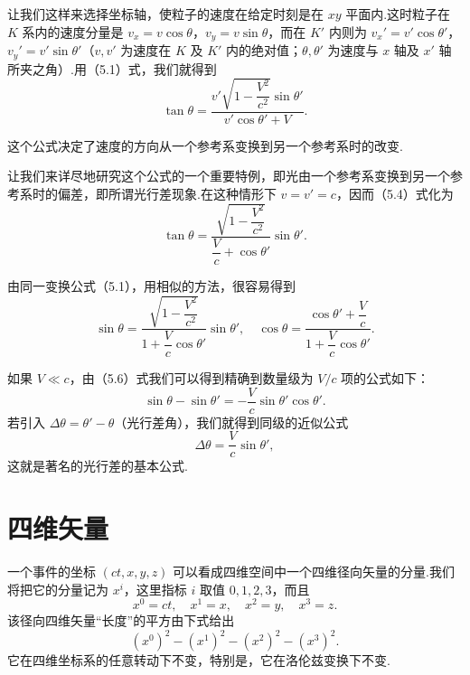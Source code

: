 让我们这样来选择坐标轴，使粒子的速度在给定时刻是在 $xy$ 平面内.这时粒子在 $K$ 系内的速度分量是 $v_x=v\cos\theta$，$v_y=v\sin\theta$，而在 $K'$ 内则为 $v_x'=v'\cos\theta'$，$v_y'=v'\sin\theta'$（$v,v'$ 为速度在 $K$ 及 $K'$ 内的绝对值；$\theta,\theta'$ 为速度与 $x$ 轴及 $x'$ 轴所夹之角）.用（5.1）式，我们就得到
\begin{equation}
  \tan\theta=\frac{v'\sqrt{1-\dfrac{V^2}{c^2}}\sin\theta'}
  {v'\cos\theta'+V}.
\end{equation}

这个公式决定了速度的方向从一个参考系变换到另一个参考系时的改变.

让我们来详尽地研究这个公式的一个重要特例，即光由一个参考系变换到另一个参考系时的偏差，即所谓光行差现象.在这种情形下 $v=v'=c$，因而（5.4）式化为
\begin{equation}
  \tan\theta=\frac{\sqrt{1-\dfrac{V^2}{c^2}}}{\dfrac{V}{c}+\cos\theta'}\sin\theta'.
\end{equation}

由同一变换公式（5.1），用相似的方法，很容易得到
\begin{equation}
  \sin\theta=\frac{\sqrt{1-\dfrac{V^2}{c^2}}}{1+\dfrac{V}{c}\cos\theta'}\sin\theta',\quad
  \cos\theta=\frac{\cos\theta'+\dfrac{V}{c}}{1+\dfrac{V}{c}\cos\theta'}.
\end{equation}

如果 $V\ll c$，由（5.6）式我们可以得到精确到数量级为 $V/c$ 项的公式如下：
\begin{equation*}
  \sin\theta-\sin\theta'=-\frac{V}{c}\sin\theta'\cos\theta'.
\end{equation*}
若引入 $\Delta\theta=\theta'-\theta$（光行差角），我们就得到同级的近似公式
\begin{equation}
  \Delta\theta=\frac{V}{c}\sin\theta',
\end{equation}
这就是著名的光行差的基本公式.

\section{四维矢量}

一个事件的坐标 $(ct,x,y,z)$ 可以看成四维空间中一个四维径向矢量的分量.我们将把它的分量记为 $x^i$，这里指标 $i$ 取值 $0,1,2,3$，而且
\begin{equation*}
  x^0=ct,\quad x^1=x,\quad x^2=y,\quad x^3=z.
\end{equation*}
该径向四维矢量“长度”的平方由下式给出
\begin{equation*}
  (x^0)^2-(x^1)^2-(x^2)^2-(x^3)^2.
\end{equation*}
它在四维坐标系的任意转动下不变，特别是，它在洛伦兹变换下不变.

